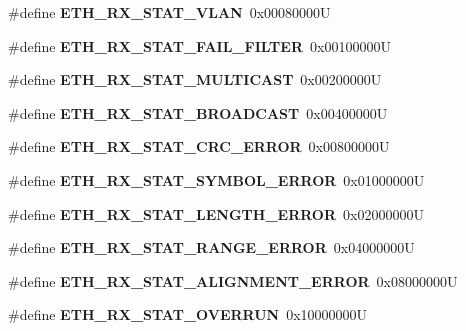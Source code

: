 \begin{DoxyCompactItemize}
\#define {\bfseries E\+T\+H\+\_\+\+R\+X\+\_\+\+S\+T\+A\+T\+\_\+\+V\+L\+AN}~0x00080000U
\item 
\mbox{\label{lpc-ethernet_8c_a3f78a048119fb2148215750ee828adf3}} 
\#define {\bfseries E\+T\+H\+\_\+\+R\+X\+\_\+\+S\+T\+A\+T\+\_\+\+F\+A\+I\+L\+\_\+\+F\+I\+L\+T\+ER}~0x00100000U
\item 
\mbox{\label{lpc-ethernet_8c_ad59f9ddd49f162f95c568c9a28153587}} 
\#define {\bfseries E\+T\+H\+\_\+\+R\+X\+\_\+\+S\+T\+A\+T\+\_\+\+M\+U\+L\+T\+I\+C\+A\+ST}~0x00200000U
\item 
\mbox{\label{lpc-ethernet_8c_ac3dd58495ac7873b2c13b05308195b70}} 
\#define {\bfseries E\+T\+H\+\_\+\+R\+X\+\_\+\+S\+T\+A\+T\+\_\+\+B\+R\+O\+A\+D\+C\+A\+ST}~0x00400000U
\item 
\mbox{\label{lpc-ethernet_8c_acdab399a3291871896b7b8980605853c}} 
\#define {\bfseries E\+T\+H\+\_\+\+R\+X\+\_\+\+S\+T\+A\+T\+\_\+\+C\+R\+C\+\_\+\+E\+R\+R\+OR}~0x00800000U
\item 
\mbox{\label{lpc-ethernet_8c_a5a177181505f81c8f058ce7c90f0d13c}} 
\#define {\bfseries E\+T\+H\+\_\+\+R\+X\+\_\+\+S\+T\+A\+T\+\_\+\+S\+Y\+M\+B\+O\+L\+\_\+\+E\+R\+R\+OR}~0x01000000U
\item 
\mbox{\label{lpc-ethernet_8c_aa66d2c3a92285943ab96cc4b53a48113}} 
\#define {\bfseries E\+T\+H\+\_\+\+R\+X\+\_\+\+S\+T\+A\+T\+\_\+\+L\+E\+N\+G\+T\+H\+\_\+\+E\+R\+R\+OR}~0x02000000U
\item 
\mbox{\label{lpc-ethernet_8c_a64f6646e665405b48a358de9cdedd616}} 
\#define {\bfseries E\+T\+H\+\_\+\+R\+X\+\_\+\+S\+T\+A\+T\+\_\+\+R\+A\+N\+G\+E\+\_\+\+E\+R\+R\+OR}~0x04000000U
\item 
\mbox{\label{lpc-ethernet_8c_a09373f0816d9b89ea3d412b28c57a3c3}} 
\#define {\bfseries E\+T\+H\+\_\+\+R\+X\+\_\+\+S\+T\+A\+T\+\_\+\+A\+L\+I\+G\+N\+M\+E\+N\+T\+\_\+\+E\+R\+R\+OR}~0x08000000U
\item 
\mbox{\label{lpc-ethernet_8c_a7bbb1af3029e6e6d80201fa3d6ea5804}} 
\#define {\bfseries E\+T\+H\+\_\+\+R\+X\+\_\+\+S\+T\+A\+T\+\_\+\+O\+V\+E\+R\+R\+UN}~0x10000000U

\end{DoxyCompactItemize}
